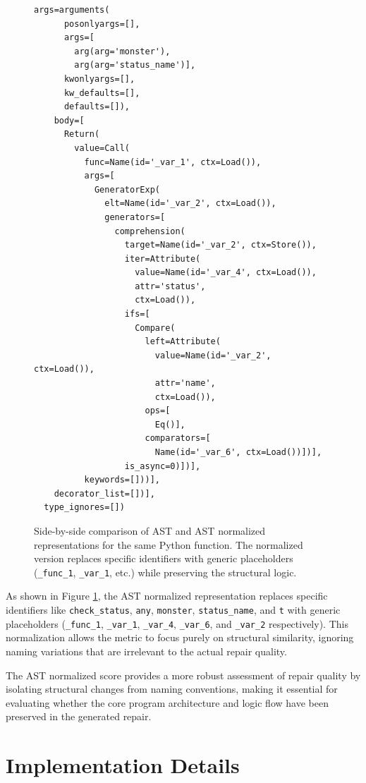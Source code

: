 \begin{figure}[h!]
\begin{minipage}{0.50\textwidth}
\begin{lstlisting}[basicstyle=\ttfamily\tiny, frame=single, breaklines=true]
    args=arguments(
      posonlyargs=[],
      args=[
        arg(arg='monster'),
        arg(arg='status_name')],
      kwonlyargs=[],
      kw_defaults=[],
      defaults=[]),
    body=[
      Return(
        value=Call(
          func=Name(id='_var_1', ctx=Load()),
          args=[
            GeneratorExp(
              elt=Name(id='_var_2', ctx=Load()),
              generators=[
                comprehension(
                  target=Name(id='_var_2', ctx=Store()),
                  iter=Attribute(
                    value=Name(id='_var_4', ctx=Load()),
                    attr='status',
                    ctx=Load()),
                  ifs=[
                    Compare(
                      left=Attribute(
                        value=Name(id='_var_2', ctx=Load()),
                        attr='name',
                        ctx=Load()),
                      ops=[
                        Eq()],
                      comparators=[
                        Name(id='_var_6', ctx=Load())])],
                  is_async=0)])],
          keywords=[]))],
    decorator_list=[])],
  type_ignores=[])
\end{lstlisting}
\end{minipage}
\caption{Side-by-side comparison of AST and AST normalized representations for the same Python function. The normalized version replaces specific identifiers with generic placeholders (\texttt{\_func\_1}, \texttt{\_var\_1}, etc.) while preserving the structural logic.}
\label{fig:ast-comparison}
\end{figure}

As shown in Figure \ref{fig:ast-comparison}, the AST normalized representation replaces specific identifiers like \texttt{check\_status}, \texttt{any}, \texttt{monster}, \texttt{status\_name}, and \texttt{t} with generic placeholders (\texttt{\_func\_1}, \texttt{\_var\_1}, \texttt{\_var\_4}, \texttt{\_var\_6}, and \texttt{\_var\_2} respectively). This normalization allows the metric to focus purely on structural similarity, ignoring naming variations that are irrelevant to the actual repair quality.

The AST normalized score provides a more robust assessment of repair quality by isolating structural changes from naming conventions, making it essential for evaluating whether the core program architecture and logic flow have been preserved in the generated repair.

\section{Implementation Details}
